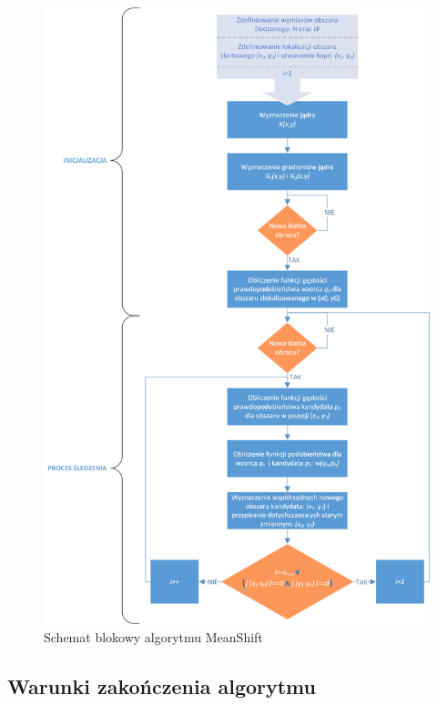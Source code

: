 \begin{figure}
	\centering
	\hspace*{-3cm}
	\includegraphics[width=14.5cm]{2_MS_visio.png}
	\caption{Schemat blokowy algorytmu MeanShift}
	\label{fig:MS_scheme}
\end{figure}
\subsection{Warunki zakończenia algorytmu}

